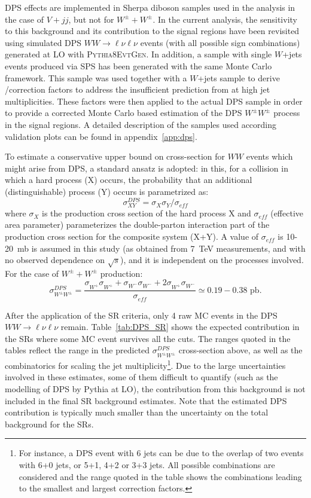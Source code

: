 DPS effects are implemented in Sherpa diboson samples used in the analysis in the case of $V+jj$, but not for $W^\pm+W^\pm$. 
In the current analysis, the sensitivity to this background and its contribution to the signal regions have been revisited using simulated DPS $WW\to\ell\nu\ell\nu$ events (with all possible sign combinations) generated at LO with \textsc{Pythia}8\textsc{EvtGen}. In addition, a sample with single $W$+jets events produced via SPS has been generated with the same Monte Carlo framework. This sample was used together with a \SHERPA $W$+jets sample to derive \SHERPA/\PYTHIA correction factors to address the insufficient prediction from  at high jet multiplicities. These factors were then applied to the actual DPS sample in order to provide a corrected Monte Carlo based estimation of the DPS $W^\pm W^\pm$ process in the signal regions.  
A detailed description of the samples used according validation plots can be found in appendix~\ref{app:dps}.

To estimate a conservative upper bound on cross-section for $WW$ events which might arise from DPS, a standard ansatz is adopted: 
in this, for a collision in which a hard process (X) occurs, the probability that 
an additional (distinguishable) process (Y) occurs is parametrized as:
\begin{equation}
\sigma^{DPS}_{XY} = \sigma^{}_{X}\sigma^{}_{Y}/\sigma^{}_{eff}
\end{equation} 
where $\sigma^{}_{X}$ is the production cross section of the hard 
process X and $\sigma^{}_{eff}$ (effective area parameter) 
parameterizes the double-parton interaction part of the production 
cross section for the composite system (X+Y). 
A value of $\sigma^{}_{eff}$ is 10-20~mb is assumed in this study (as obtained from 7~TeV measurements, and with no observed dependence on $\sqrt{s}$), and it is independent on the processes involved. For the case of $W^\pm+W^\pm$ production:
\begin{equation}
\sigma^{DPS}_{W^\pm W^\pm} = \frac{ \sigma^{}_{W^+}\sigma^{}_{W^+} + \sigma^{}_{W^-}\sigma^{}_{W^-} + 2\sigma^{}_{W^+}\sigma^{}_{W^-}}{\sigma^{}_{eff} } \simeq 0.19-0.38\text{ pb.}
\end{equation} 

After the application of the SR criteria, only 4 raw MC events in the DPS $WW\to\ell\nu\ell\nu$ remain. 
Table~\ref{tab:DPS_SR} shows the expected contribution in the SRs where some MC event survives all the cuts. The ranges quoted in the tables reflect the range in the predicted $\sigma^{DPS}_{W^\pm W^\pm}$ cross-section above, as well as the combinatorics for scaling the jet multiplicity\footnote{For instance, a DPS event with 6 jets can be due to the overlap of two events with 6+0 jets, or 5+1, 4+2 or 3+3 jets. All possible combinations are considered and the range quoted in the table shows the combinations leading to the smallest and largest correction factors.}.
Due to the large uncertainties involved in these estimates, some of them difficult to quantify (such as the modelling of DPS by {\sc Pythia} at LO), the contribution from this background is not included in the final SR background estimates. 
Note that the estimated DPS contribution is typically much smaller than the uncertainty on the total background for the SRs.

